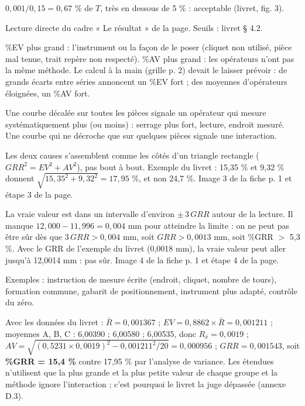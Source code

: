 \documentclass[10pt,a4paper]{article}
\begin{document}
\begin{description}[leftmargin=0pt,style=nextline,itemsep=3pt]
\item[Q1 (fiche stagiaire p. 3)] $0{,}001 / 0{,}15 = 0{,}67$ \% de $T$, très en dessous de 5 \% : acceptable (livret, fig. 3).
\item[Q2 (p. 3)] Lecture directe du cadre « Le résultat » de la page. Seuils : livret § 4.2.
\item[Q3 (p. 3)] \%EV plus grand : l'instrument ou la façon de le poser (cliquet non utilisé, pièce mal tenue, trait repère non respecté). \%AV plus grand : les opérateurs n'ont pas la même méthode. Le calcul à la main (grille p. 2) devait le laisser prévoir : de grands écarts entre séries annoncent un \%EV fort ; des moyennes d'opérateurs éloignées, un \%AV fort.
\item[Q4 (p. 3)] Une courbe décalée sur toutes les pièces signale un opérateur qui mesure systématiquement plus (ou moins) : serrage plus fort, lecture, endroit mesuré. Une courbe qui ne décroche que sur quelques pièces signale une interaction.
\item[Q5 (p. 3)] Les deux causes s'assemblent comme les côtés d'un triangle rectangle ($GRR^2 = EV^2 + AV^2$), pas bout à bout. Exemple du livret : 15,35 \% et 9,32 \% donnent $\sqrt{15{,}35^2 + 9{,}32^2} = 17{,}95$ \%, et non 24,7 \%. Image 3 de la fiche p. 1 et étape 3 de la page.
\item[Q6 (p. 3)] La vraie valeur est dans un intervalle d'environ $\pm\,3\,GRR$ autour de la lecture. Il manque $12{,}000 - 11{,}996 = 0{,}004$ mm pour atteindre la limite : on ne peut pas être sûr dès que $3\,GRR > 0{,}004$ mm, soit $GRR > 0{,}0013$ mm, soit \%GRR $>$ 5,3 \%. Avec le GRR de l'exemple du livret (0,0018 mm), la vraie valeur peut aller jusqu'à 12,0014 mm : pas sûr. Image 4 de la fiche p. 1 et étape 4 de la page.
\item[Q7 (p. 3)] Exemples : instruction de mesure écrite (endroit, cliquet, nombre de tours), formation commune, gabarit de positionnement, instrument plus adapté, contrôle du zéro.
\item[Défi (p. 3)] Avec les données du livret :
$\bar R = 0{,}001367$ ; $EV = 0{,}8862 \times \bar R = 0{,}001211$ ;
moyennes A, B, C : 6,00390 ; 6,00580 ; 6,00535, donc $R_{\bar x} = 0{,}0019$ ;
$AV = \sqrt{(0{,}5231 \times 0{,}0019)^2 - 0{,}001211^2/20} = 0{,}000956$ ;
$GRR = 0{,}001543$, soit \textbf{\%GRR = 15,4 \%} contre 17,95 \% par l'analyse de variance.
Les étendues n'utilisent que la plus grande et la plus petite valeur de chaque groupe et la méthode ignore l'interaction ; c'est pourquoi le livret la juge dépassée (annexe D.3).
\end{description}
\end{document}
